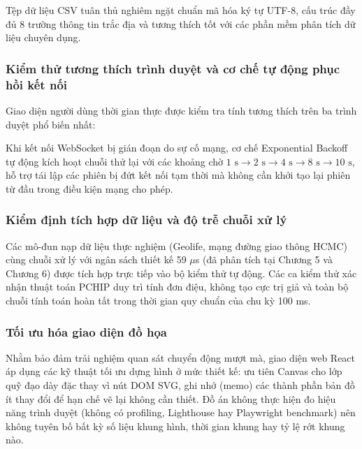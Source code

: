 Tệp dữ liệu CSV tuân thủ nghiêm ngặt chuẩn mã hóa ký tự UTF-8, cấu trúc đầy đủ 8 trường thông tin trắc địa và tương thích tốt với các phần mềm phân tích dữ liệu chuyên dụng.

\subsubsection{Kiểm thử tương thích trình duyệt và cơ chế tự động phục hồi kết nối}

\hspace{0.5cm} Giao diện người dùng thời gian thực được kiểm tra tính tương thích trên ba trình duyệt phổ biến nhất:

Khi kết nối WebSocket bị gián đoạn do sự cố mạng, cơ chế Exponential Backoff tự động kích hoạt chuỗi thử lại với các khoảng chờ $1\text{ s} \to 2\text{ s} \to 4\text{ s} \to 8\text{ s} \to 10\text{ s}$, hỗ trợ tái lập các phiên bị đứt kết nối tạm thời mà không cần khởi tạo lại phiên từ đầu trong điều kiện mạng cho phép.

\subsubsection{Kiểm định tích hợp dữ liệu và độ trễ chuỗi xử lý}

\hspace{0.5cm} Các mô-đun nạp dữ liệu thực nghiệm (Geolife, mạng đường giao thông HCMC) cùng chuỗi xử lý với ngân sách thiết kế 59 $\mu$s (đã phân tích tại Chương 5 và Chương 6) được tích hợp trực tiếp vào bộ kiểm thử tự động. Các ca kiểm thử xác nhận thuật toán PCHIP duy trì tính đơn điệu, không tạo cực trị giả và toàn bộ chuỗi tính toán hoàn tất trong thời gian quy chuẩn của chu kỳ 100 ms.


\subsubsection{Tối ưu hóa giao diện đồ họa}

\hspace{0.5cm} Nhằm bảo đảm trải nghiệm quan sát chuyển động mượt mà, giao diện web React áp dụng các kỹ thuật tối ưu dựng hình ở mức thiết kế: ưu tiên Canvas cho lớp quỹ đạo dày đặc thay vì nút DOM SVG, ghi nhớ (memo) các thành phần bản đồ ít thay đổi để hạn chế vẽ lại không cần thiết. Đồ án không thực hiện đo hiệu năng trình duyệt (không có profiling, Lighthouse hay Playwright benchmark) nên không tuyên bố bất kỳ số liệu khung hình, thời gian khung hay tỷ lệ rớt khung nào.

